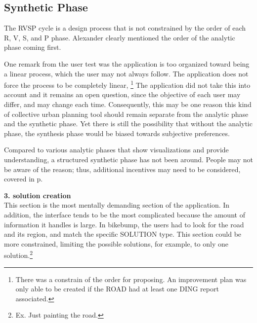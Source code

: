 \subsection{Synthetic Phase}
The RVSP cycle is a design process that is not constrained by the order of each R, V, S, and P phase. Alexander clearly mentioned the order of the analytic phase coming first.


One remark from the user test was the application is too organized toward being a linear process, which the user may not always follow. The application does not force the process to be completely linear, 
\footnote{There was a constrain of the order for proposing. An improvement plan was only able to be created if the ROAD had at least one DING report associated.}
 The application did not take this into account and it remains an open question, since the objective of each user may differ, and may change each time. Consequently, this may be one reason this kind of collective urban planning tool should remain separate from the analytic phase and the synthetic phase. Yet there is still the possibility that without the analytic phase, the synthesis phase would be biased towards subjective preferences.

Compared to various analytic phases that show visualizations and provide understanding, a structured synthetic phase has not been around. People may not be aware of the reason; thus, additional incentives may need to be considered, covered in p.\pageref{sec:incent}

\textbf{3. solution creation} \\ 
This section is the most mentally demanding section of the application.  In addition, the interface tends to be the most complicated because the amount of information it handles is large. In bikebump, the users had to look for the road and its region, and match the specific SOLUTION type. This section could be more constrained, limiting the possible solutions, for example, to only one solution.\footnote{Ex. Just painting the road.}

